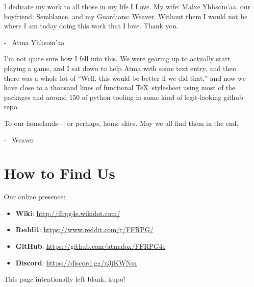 \begin{multicols}{2}
I dedicate my work to all those in my life I Love.  My wife: Malxe Yhhsom'aa, our boyfriend: Semblance, and my Guardians: Weaver.  Without them I would not be where I am today doing this work that I love.  Thank you. \pc%

- {\ferrum\ Atma Yhhsom'aa}\pw%

I'm not quite sure how I fell into this. We were gearing up to actually start playing a game, and I sat down to help Atma with some text entry, and then there was a whole lot of “Well, this would be better if we did that,” and now we have close to a thousand lines of functional \TeX\ stylesheet using most of the packages and around 150 of python tooling in some kind of legit-looking github repo.\pc%

To our homelands--- or perhaps, home skies. May we all find them in the end.\pc%

- {\ferrum\ Weaver}%

\section{How to Find Us}\label{sec:forward-findus}

Our online presence:%
\begin{itemize}
    \item \textbf{Wiki}: \url{http://ffrpg4e.wikidot.com/}
    \item \textbf{Reddit}: \url{https://www.reddit.com/r/FFRPG/}
    \item \textbf{GitHub}: \url{https://github.com/atmafox/FFRPG4e}
    \item \textbf{Discord}: \url{https://discord.gg/n3jKWNm}
\end{itemize}
\end{multicols}

\clearpage
\begin{center}



    \textcolor{mogred}{\arabtype\LARGE This page intentionally left blank, kupo!}

\end{center}